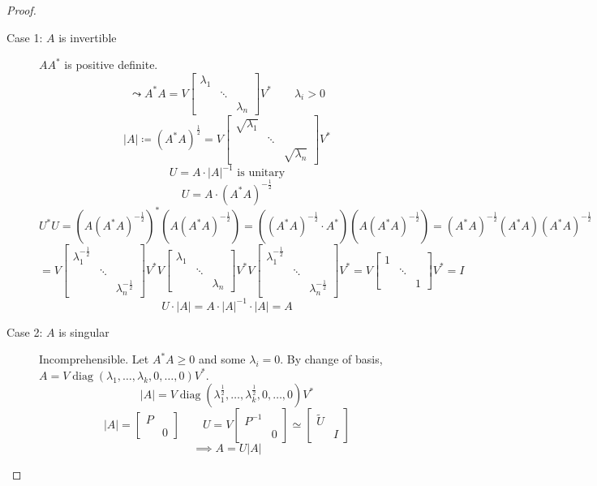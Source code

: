 \documentclass[a4paper]{article}
\numberwithin{lecref}{section}
\newcommand{\card}[1]{\left|#1\right|}
\begin{document}
\begin{proof}
  \begin{description}
    \item[Case 1: $A$ is invertible]
      $A A^*$ is positive definite.
      \[ \leadsto A^* A = V \begin{bmatrix} \lambda_1 & &  \\ & \ddots & \\ & & \lambda_n \end{bmatrix} V^* \qquad \lambda_i > 0 \]
      \[ \card{A} \coloneqq (A^* A)^{\frac12} = V \begin{bmatrix} \sqrt{\lambda_1} & &  \\ & \ddots & \\ & & \sqrt{\lambda_n} \end{bmatrix} V^* \]
      \[ U = A \cdot \card{A}^{-1} \text{ is unitary} \]
      \[ U = A \cdot (A^* A)^{-\frac12} \]
      \[ U^* U = (A(A^* A)^{-\frac12})^* (A (A^* A)^{-\frac12}) = ((A^* A)^{-\frac12} \cdot A^*) (A (A^* A)^{-\frac12}) = (A^* A)^{-\frac12} (A^* A) (A^* A)^{-\frac12} \]
      \[ = V \begin{bmatrix} \lambda_1^{-\frac12} & & \\ & \ddots & \\ & & \lambda_n^{-\frac12} \end{bmatrix} V^* V \begin{bmatrix} \lambda_1 & & \\ & \ddots & \\ & & \lambda_n \end{bmatrix} V^* V \begin{bmatrix} \lambda_1^{-\frac12} & & \\ & \ddots & \\ & & \lambda_n^{-\frac12} \end{bmatrix} V^* = V \begin{bmatrix} 1 & & \\ & \ddots & \\ & & 1 \end{bmatrix} V^* = I \]
      \[ U \cdot \card{A} = A \cdot \card{A}^{-1} \cdot \card{A} = A \]
    \item[Case 2: $A$ is singular] Incomprehensible.
      Let $A^* A \geq 0$ and some $\lambda_i = 0$.
      By change of basis, $A = V \operatorname{diag}(\lambda_1, \dots, \lambda_k, 0, \dots, 0) V^*$.
      \[ \card{A} = V \operatorname{diag}(\lambda_1^{\frac12}, \dots, \lambda_k^{\frac12}, 0, \dots, 0) V^* \]
      \[ \card{A} = \begin{bmatrix} P & \\ & 0 \end{bmatrix} \qquad U = V \begin{bmatrix} P^{-1} & \\ & 0 \end{bmatrix} \simeq \begin{bmatrix} \tilde U & \\ & I \end{bmatrix} \]
      \[ \implies A = U \card{A} \]
  \end{description}
\end{proof}
\end{document}
